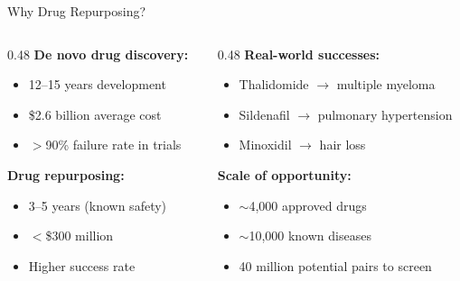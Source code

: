 \documentclass[aspectratio=169,11pt]{beamer}
\begin{document}
\begin{frame}{Why Drug Repurposing?}

\begin{columns}[T]
\begin{column}{0.48\textwidth}
\textbf{De novo drug discovery:}
\begin{itemize}
    \item 12--15 years development
    \item \$2.6 billion average cost
    \item $>$90\% failure rate in trials
\end{itemize}

\vspace{1em}

\textbf{Drug repurposing:}
\begin{itemize}
    \item 3--5 years (known safety)
    \item $<$\$300 million
    \item Higher success rate
\end{itemize}
\end{column}

\begin{column}{0.48\textwidth}
\textbf{Real-world successes:}
\begin{itemize}
    \item Thalidomide $\to$ multiple myeloma
    \item Sildenafil $\to$ pulmonary hypertension
    \item Minoxidil $\to$ hair loss
\end{itemize}

\vspace{1em}

\textbf{Scale of opportunity:}
\begin{itemize}
    \item $\sim$4,000 approved drugs
    \item $\sim$10,000 known diseases
    \item 40 million potential pairs to screen
\end{itemize}
\end{column}
\end{columns}

\end{frame}

\end{document}

